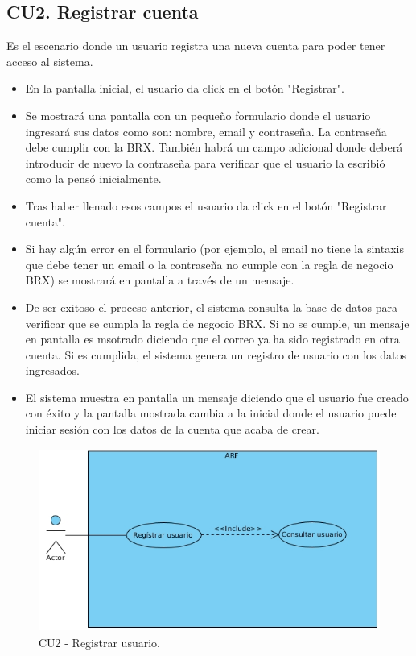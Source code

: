 \subsection{CU2. Registrar cuenta} \par
Es el escenario donde un usuario registra una nueva cuenta para poder tener acceso al sistema.
	\begin{itemize}
		\item En la pantalla inicial, el usuario da click en el botón "Registrar".
		\item Se mostrará una pantalla con un pequeño formulario donde el usuario ingresará sus datos como son: nombre, email y contraseña. La contraseña debe cumplir con la BRX. También habrá un campo adicional donde deberá introducir de nuevo la contraseña para verificar que el usuario la escribió como la pensó inicialmente.
		\item Tras haber llenado esos campos el usuario da click en el botón "Registrar cuenta".
		\item Si hay algún error en el formulario (por ejemplo, el email no tiene la sintaxis que debe tener un email o la contraseña no cumple con la regla de negocio BRX) se mostrará en pantalla a través de un mensaje.
		\item De ser exitoso el proceso anterior, el sistema consulta la base de datos para verificar que se cumpla la regla de negocio BRX. Si no se cumple, un mensaje en pantalla es msotrado diciendo que el correo ya ha sido registrado en otra cuenta. Si es cumplida, el sistema genera un registro de usuario con los datos ingresados.
		\item El sistema muestra en pantalla un mensaje diciendo que el usuario fue creado con éxito y la pantalla mostrada cambia a la inicial donde el usuario puede iniciar sesión con los datos de la cuenta que acaba de crear.
	\end{itemize}
\begin{figure}[h!]
	\centering
	\includegraphics[width=12cm,height=6cm]{imagenes/analisis/registrarUsuario.jpg}
	\caption{CU2 - Registrar usuario.}
	\label{fig:analogo}
\end{figure} 
\newpage
